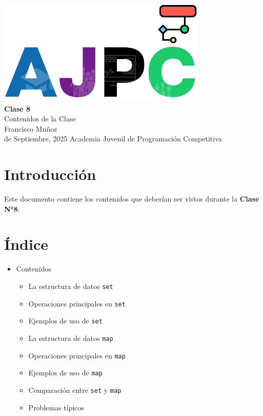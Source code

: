 \documentclass{article}
\newcommand{\documentTitle}{Clase 8}
\newcommand{\documentSubtitle}{Contenidos de la Clase}
\newcommand{\documentAuthor}{Francisco Muñoz}
\newcommand{\documentDate}{13 de Septiembre, 2025}
\begin{document}
\thispagestyle{empty}
\AddToShipoutPictureBG*{}
\begin{center}
    \vspace*{2cm}
    \includegraphics[width=0.75\textwidth]{logo.png} \\[1.5cm]
    {\Huge \textbf{\documentTitle}} \\[0.5cm]
    {\Large \documentSubtitle} \\[1.5cm]
    {\large \documentAuthor} \\[0.5cm]
    {\large \space \space \documentDate}
    \vfill
    {\large Academia Juvenil de Programación Competitiva}
\end{center}
\newpage

\section{Introducción}

Este documento contiene los contenidos que deberían ser vistos durante la \textbf{Clase N°8}.

\section{Índice}

\begin{itemize}
    \item Contenidos
    \begin{itemize}
        \item La estructura de datos \texttt{set}
        \item Operaciones principales en \texttt{set}
        \item Ejemplos de uso de \texttt{set}
        \item La estructura de datos \texttt{map}
        \item Operaciones principales en \texttt{map}
        \item Ejemplos de uso de \texttt{map}
        \item Comparación entre \texttt{set} y \texttt{map}
        \item Problemas típicos
    \end{itemize}
\end{itemize}
\end{document}
